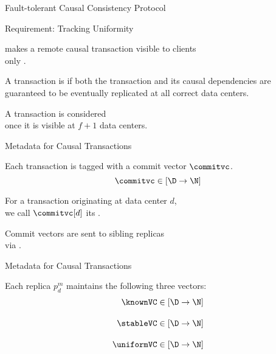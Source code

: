 
\begin{frame}{}
  \begin{center}
    {\Large Fault-tolerant Causal Consistency Protocol}
  \end{center}
\end{frame}

\begin{frame}{Requirement: Tracking Uniformity}
  \begin{center}
    \unistore{} makes a remote causal transaction visible to clients \\[3pt]
    only .

    \pause
    \vspace{0.30cm}
    \begin{definition}[Uniform]
      A transaction is  if both the transaction
      and its causal dependencies are guaranteed to be eventually
      replicated at all correct data centers.
    \end{definition}

    \pause
    \vspace{0.50cm}
    A transaction is considered  \\[3pt]
    once it is visible at $f + 1$ data centers.
  \end{center}
\end{frame}

\begin{frame}{Metadata for Causal Transactions}
  \begin{center}
    Each transaction is tagged with a commit vector $\commitvc$.
    \[
      \commitvc \in [\D \to \N]
    \]

    \vspace{0.20cm}
    For a transaction originating at data center $d$, \\[3pt]
    we call $\commitvc[d]$ its .

    \pause
    \vspace{0.60cm}
    Commit vectors are sent to sibling replicas \\[3pt]
    via .
  \end{center}
\end{frame}

\begin{frame}{Metadata for Causal Transactions}
  \begin{center}
    Each replica $p^{m}_{d}$ maintains the following three vectors:
    \begin{align*}
      \knownVC &\in [\D \to \N] \\[10pt]
      \stableVC &\in [\D \to \N] \\[10pt]
      \uniformVC &\in [\D \to \N]
    \end{align*}
  \end{center}
\end{frame}


